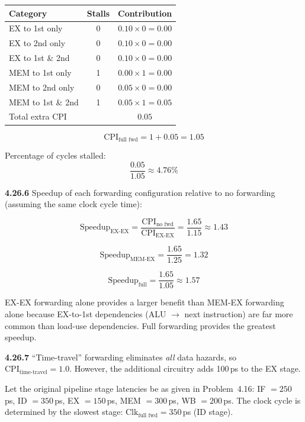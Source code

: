 \begin{center}
\begin{tabular}{lcc}
\toprule
\textbf{Category} & \textbf{Stalls} & \textbf{Contribution} \\
\midrule
EX to 1st only     & 0 & $0.10 \times 0 = 0.00$ \\
EX to 2nd only     & 0 & $0.10 \times 0 = 0.00$ \\
EX to 1st \& 2nd   & 0 & $0.10 \times 0 = 0.00$ \\
MEM to 1st only    & 1 & $0.00 \times 1 = 0.00$ \\
MEM to 2nd only    & 0 & $0.05 \times 0 = 0.00$ \\
MEM to 1st \& 2nd  & 1 & $0.05 \times 1 = 0.05$ \\
\midrule
\multicolumn{2}{l}{Total extra CPI} & $0.05$ \\
\bottomrule
\end{tabular}
\end{center}
\[
  \text{CPI}_{\text{full fwd}} = 1 + 0.05 = 1.05
\]

Percentage of cycles stalled:
\[
  \frac{0.05}{1.05} \approx 4.76\%
\]

\medskip\noindent\textbf{4.26.6}
Speedup of each forwarding configuration relative to no forwarding
(assuming the same clock cycle time):

\[
  \text{Speedup}_{\text{EX-EX}} = \frac{\text{CPI}_{\text{no fwd}}}
    {\text{CPI}_{\text{EX-EX}}}
  = \frac{1.65}{1.15} \approx 1.43
\]

\[
  \text{Speedup}_{\text{MEM-EX}} = \frac{1.65}{1.25} = 1.32
\]

\[
  \text{Speedup}_{\text{full}} = \frac{1.65}{1.05} \approx 1.57
\]

EX-EX forwarding alone provides a larger benefit than MEM-EX forwarding alone
because EX-to-1st dependencies (ALU $\to$ next instruction) are far more
common than load-use dependencies. Full forwarding provides the greatest
speedup.

\medskip\noindent\textbf{4.26.7}
``Time-travel'' forwarding eliminates \emph{all} data hazards, so
$\text{CPI}_{\text{time-travel}} = 1.0$. However, the additional circuitry
adds 100\,ps to the EX stage.

Let the original pipeline stage latencies be as given in Problem~4.16:
IF $= 250$\,ps, ID $= 350$\,ps, EX $= 150$\,ps, MEM $= 300$\,ps,
WB $= 200$\,ps. The clock cycle is determined by the slowest stage:
$\text{Clk}_{\text{full fwd}} = 350$\,ps (ID stage).

